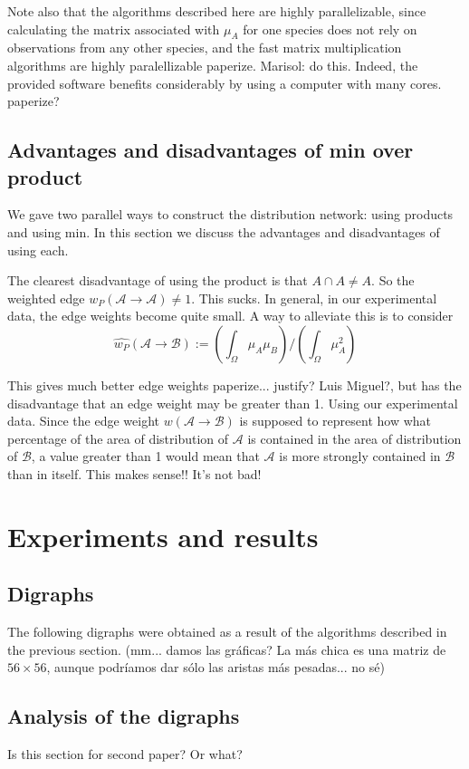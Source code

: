 \documentclass[12pt]{article}
\numberwithin{equation}{section} %
\numberwithin{figure}{section} %
\def\cA{{\mathcal{A}}}
\def\cB{{\mathcal{B}}}
\theoremstyle{definition}
\def\tcr#1{\textcolor{MyRed}{#1}}
\begin{document}
Note also that the algorithms described here are highly parallelizable, since calculating the matrix associated with $\mu_A$ for one species does not rely on observations from any other species, and the fast matrix multiplication algorithms are highly paralellizable \tcr{paperize. Marisol: do this}. Indeed, the provided software benefits considerably by using a computer with many cores. \tcr{paperize?}

\subsection{Advantages and disadvantages of min over product}

We gave two parallel ways to construct the distribution network: using products and using min. In this section we discuss the advantages and disadvantages of using each.

The clearest disadvantage of using the product is that $A\cap A \neq A$. So the weighted edge $w_P(\cA \to \cA) \neq 1$. This sucks. In general, in our experimental data, the edge weights become quite small. A way to alleviate this is to consider
	$$\widehat{w_P}(\cA \to \cB) := \left(\int_\Omega \mu_A\mu_B\right)\big/\left(\int_\Omega \mu_A^2\right)$$
	
This gives much better edge weights \tcr{paperize... justify? Luis Miguel?}, but has the disadvantage that an edge weight may be greater than 1. Using our experimental data. Since the edge weight $w(\cA \to \cB)$ is supposed to represent how what percentage of the area of distribution of $\cA$ is contained in the area of distribution of $\cB$, a value greater than 1 would mean that $\cA$ is more strongly contained in $\cB$ than in itself. This makes sense!! It's not bad!

\section{Experiments and results}

\subsection{Digraphs}
The following digraphs were obtained as a result of the algorithms described in the previous section. \tcr{(mm... damos las gráficas? La más chica es una matriz de $56\times56$, aunque podríamos dar sólo las aristas más pesadas... no sé)}

\subsection{Analysis of the digraphs}
\tcr{Is this section for second paper? Or what?}
\end{document}
